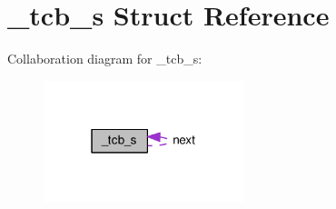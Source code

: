 \hypertarget{struct__tcb__s}{}\section{\+\_\+tcb\+\_\+s Struct Reference}
\label{struct__tcb__s}


Collaboration diagram for \+\_\+tcb\+\_\+s\+:\nopagebreak
\begin{figure}[H]
\begin{center}
\leavevmode
\includegraphics[width=166pt]{struct__tcb__s__coll__graph}
\end{center}
\end{figure}
